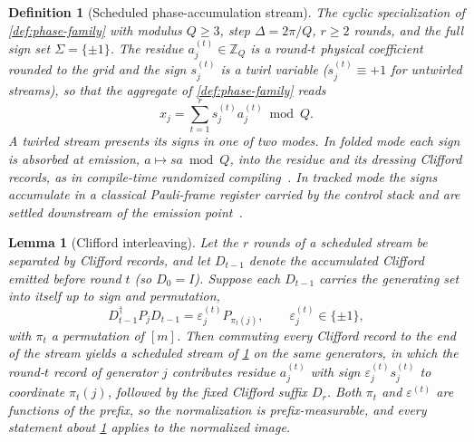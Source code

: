 \documentclass[a4paper,twocolumn,10pt,unpublished]{quantumarticle}
\newtheorem{definition}{Definition}
\newtheorem{lemma}{Lemma}
\begin{document}
\begin{definition}[Scheduled phase-accumulation stream]
\label{def:scheduled-stream}
The cyclic specialization of \cref{def:phase-family} with modulus
$Q\geq3$, step $\Delta=2\pi/Q$, $r\geq2$ rounds, and the full sign set
$\Sigma=\{\pm1\}$.  The residue $a_j^{(t)}\in\mathbb Z_Q$ is a round-$t$
physical coefficient rounded to the grid and the sign $s_j^{(t)}$ is a
twirl variable ($s_j^{(t)}\equiv+1$ for untwirled streams), so that the
aggregate of \cref{def:phase-family} reads
\begin{equation}\label{eq:scheduled-aggregate}
 x_j=\sum_{t=1}^r s_j^{(t)}a_j^{(t)}\bmod Q .
\end{equation}
A twirled stream presents its signs in one of two modes.  In
\emph{folded} mode each sign is absorbed at emission,
$a\mapsto sa\bmod Q$, into the residue and its dressing Clifford
records, as in compile-time randomized
compiling~\cite{wallman2016noise,hashim2021randomized}.  In
\emph{tracked} mode the signs accumulate in a classical Pauli-frame
register carried by the control stack and are settled downstream of the
emission point~\cite{knill2005realistically,riesebos2017pauli}.
\end{definition}

\begin{lemma}[Clifford interleaving]
\label{lem:clifford-interleaving}
Let the $r$ rounds of a scheduled stream be separated by Clifford
records, and let $D_{t-1}$ denote the accumulated Clifford emitted
before round $t$ (so $D_0=I$).  Suppose each $D_{t-1}$ carries the
generating set into itself up to sign and permutation,
\begin{equation}\label{eq:clifford-normalizes}
 D_{t-1}^\dagger P_jD_{t-1}=\varepsilon_j^{(t)}P_{\pi_t(j)},
 \qquad \varepsilon_j^{(t)}\in\{\pm1\},
\end{equation}
with $\pi_t$ a permutation of $[m]$.  Then commuting every Clifford
record to the end of the stream yields a scheduled stream of
\cref{def:scheduled-stream} on the same generators, in which the
round-$t$ record of generator $j$ contributes residue $a_j^{(t)}$ with
sign $\varepsilon_j^{(t)}s_j^{(t)}$ to coordinate $\pi_t(j)$, followed
by the fixed Clifford suffix $D_r$.  Both $\pi_t$ and
$\varepsilon^{(t)}$ are functions of the prefix, so the normalization is
prefix-measurable, and every statement about
\cref{def:scheduled-stream} applies to the normalized image.
\end{lemma}
\end{document}

